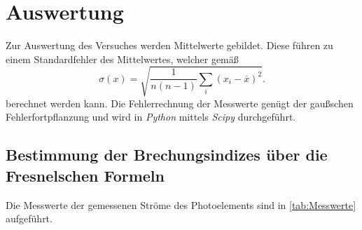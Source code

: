 \section{Auswertung}
\label{sec:Auswertung}
Zur Auswertung des Versuches werden Mittelwerte gebildet. Diese führen zu einem Standardfehler des Mittelwertes, welcher gemäß
\begin{equation*}
  \label{eqn:MW-Fehler}
  \sigma(x) = \sqrt{\frac{1}{n(n-1)} \sum_i (x_i - \overline{x})^2}.
\end{equation*}
berechnet werden kann. Die Fehlerrechnung der Messwerte genügt der gaußschen Fehlerfortpflanzung und wird in \textit{Python} mittels \textit{Scipy} \cite{scipy} durchgeführt.

\subsection{Bestimmung der Brechungsindizes über die Fresnelschen Formeln}
\label{subsec:Index_Fresnel}
Die Messwerte der gemessenen Ströme des Photoelements sind in \autoref{tab:Messwerte} aufgeführt. 

